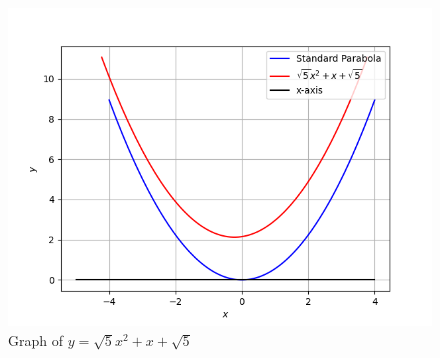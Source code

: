 \documentclass[journal,12pt,twocolumn]{IEEEtran}
\begin{document}
 \begin{figure}[!ht]
\centering
 \includegraphics[width=\columnwidth]{graph.png}
 \caption{Graph of $ y = \sqrt{5}x^2 + x + \sqrt{5} $}
 \end{figure}
\end{document}
